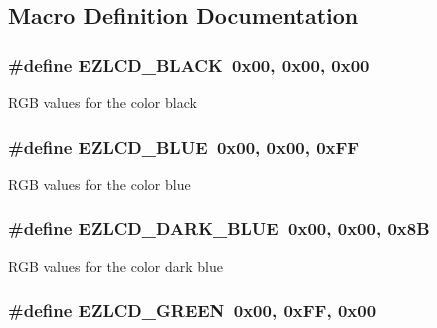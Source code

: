\subsection{Macro Definition Documentation}
\hypertarget{group__ez_l_c_d__103__colors_ga8f5a452b20fe0b028fe4b9ebee7b6a8f}{
\subsubsection[{E\-Z\-L\-C\-D\-\_\-\-B\-L\-A\-C\-K}]{\setlength{\rightskip}{0pt plus 5cm}\#define E\-Z\-L\-C\-D\-\_\-\-B\-L\-A\-C\-K~0x00, 0x00, 0x00}}\label{group__ez_l_c_d__103__colors_ga8f5a452b20fe0b028fe4b9ebee7b6a8f}
R\-G\-B values for the color black \hypertarget{group__ez_l_c_d__103__colors_ga4d6fad8736290190dc77416b6fd4c0ff}{
\subsubsection[{E\-Z\-L\-C\-D\-\_\-\-B\-L\-U\-E}]{\setlength{\rightskip}{0pt plus 5cm}\#define E\-Z\-L\-C\-D\-\_\-\-B\-L\-U\-E~0x00, 0x00, 0x\-F\-F}}\label{group__ez_l_c_d__103__colors_ga4d6fad8736290190dc77416b6fd4c0ff}
R\-G\-B values for the color blue \hypertarget{group__ez_l_c_d__103__colors_gaa75c0d07cc9a0c45cd6836178e9e4c74}{
\subsubsection[{E\-Z\-L\-C\-D\-\_\-\-D\-A\-R\-K\-\_\-\-B\-L\-U\-E}]{\setlength{\rightskip}{0pt plus 5cm}\#define E\-Z\-L\-C\-D\-\_\-\-D\-A\-R\-K\-\_\-\-B\-L\-U\-E~0x00, 0x00, 0x8\-B}}\label{group__ez_l_c_d__103__colors_gaa75c0d07cc9a0c45cd6836178e9e4c74}
R\-G\-B values for the color dark blue \hypertarget{group__ez_l_c_d__103__colors_ga0c1e04eb08d8f3a66eac93e18958ca69}{
\subsubsection[{E\-Z\-L\-C\-D\-\_\-\-G\-R\-E\-E\-N}]{\setlength{\rightskip}{0pt plus 5cm}\#define E\-Z\-L\-C\-D\-\_\-\-G\-R\-E\-E\-N~0x00, 0x\-F\-F, 0x00}}\label{group__ez_l_c_d__103__colors_ga0c1e04eb08d8f3a66eac93e18958ca69}
